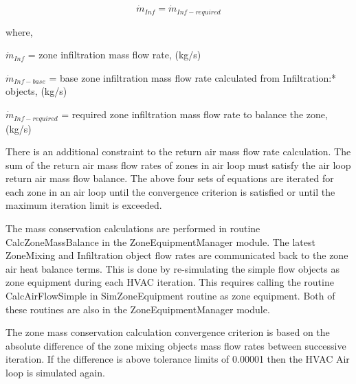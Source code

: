 \begin{equation}
{\dot m_{Inf}} = {\dot m_{Inf-required}}
\end{equation}

where,

\({\dot m_{Inf}}\) = zone infiltration mass flow rate, (kg/s)

\({\dot m_{Inf-base}}\) = base zone infiltration mass flow rate calculated from Infiltration:* objects, (kg/s)

\({\dot m_{Inf-required}}\) = required zone infiltration mass flow rate to balance the zone, (kg/s)

There is an additional constraint to the return air mass flow rate calculation. The sum of the return air mass flow rates of zones in air loop must satisfy the air loop return air mass flow balance. The above four sets of equations are iterated for each zone in an air loop until the convergence criterion is satisfied or until the maximum iteration limit is exceeded.

The mass conservation calculations are performed in routine CalcZoneMassBalance in the ZoneEquipmentManager module. The latest ZoneMixing and Infiltration object flow rates are communicated back to the zone air heat balance terms. This is done by re-simulating the simple flow objects as zone equipment during each HVAC iteration. This requires calling the routine CalcAirFlowSimple in SimZoneEquipment routine as zone equipment. Both of these routines are also in the ZoneEquipmentManager module.

The zone mass conservation calculation convergence criterion is based on the absolute difference of the zone mixing objects mass flow rates between successive iteration. If the difference is above tolerance limits of 0.00001 then the HVAC Air loop is simulated again.
